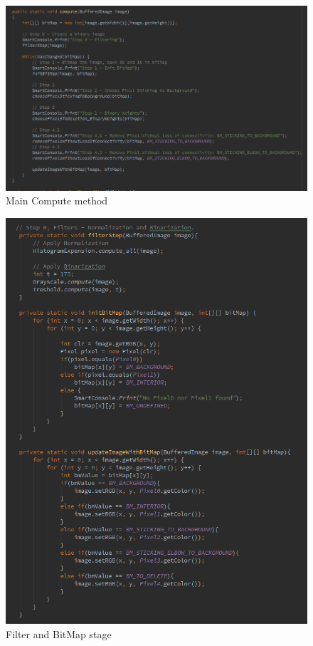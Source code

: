 \documentclass{article}
\begin{document}
%
%
\begin{figure}[H]
\centering

  \includegraphics[width=0.9\linewidth]{res/kmm/compute.png}

\caption{Main Compute method}
\label{fig:kmm_compute}
\end{figure}


%
%
\begin{figure}[H]
\centering

  \includegraphics[width=0.9\linewidth]{res/kmm/filter_bitmap.png}

\caption{Filter and BitMap stage}
\label{fig:kmm_filter}
\end{figure}
\end{document}
